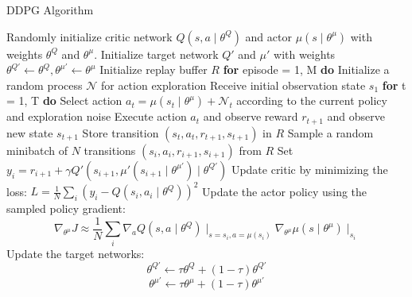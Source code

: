 \begin{algorithm}[H]
    \caption{DDPG Algorithm}
    \begin{algorithmic}[1]
        \State Randomly initialize critic network $Q(s,a \mid \theta^Q)$ and actor $\mu(s \mid \theta^\mu)$ with weights $\theta^Q$ and $\theta^\mu$.
        \State Initialize target network $Q'$ and $\mu'$ with weights $\theta^{Q'} \leftarrow \theta^Q , \theta^{\mu'} \leftarrow \theta^\mu$ 
        \State Initialize replay buffer $R$
        \State \textbf{for} episode = 1, M \textbf{do}
        \Indent
            \State Initialize a random process $\mathcal{N}$ for action exploration
            \State Receive initial observation state $s_1$
            \State \textbf{for} t = 1, T \textbf{do}
            \Indent
                \State Select action $a_t = \mu(s_t \mid \theta^\mu) + \mathcal{N}_t$ according to the current policy and exploration noise
                \State Execute action $a_t$ and observe reward $r_{t+1}$ and observe new state $s_{t+1}$
                \State Store transition $(s_t, a_t, r_{t+1}, s_{t+1})$ in $R$
                \State Sample a random minibatch of $N$ transitions $(s_i,a_i, r_{i+1}, s_{i+1})$ from $R$
                \State Set $y_i = r_{i+1} + \gamma Q' (s_{i+1}, \mu'(s_{i+1} \mid \theta^{\mu'})  \mid \theta^{Q'})$
                \State Update critic by minimizing the loss: 
                $L = \frac{1}{N} \sum_i{(y_i - Q(s_i, a_i \mid \theta^Q))^2}$
                \State Update the actor policy using the sampled policy gradient:
                \State \begin{equation*}
                    \nabla_{\theta^\mu} J \approx \frac{1}{N}
                    \sum_i{\nabla_a Q(s, a \mid \theta^Q) 
                    \mid_{s = s_i, a=\mu(s_i)} \nabla_{\theta^\mu} \mu(s \mid \theta^\mu) \mid_{s_i}}
                \end{equation*}
                \State Update the target networks:
                \State \begin{equation*}
                    \theta^{Q'} \leftarrow \tau \theta^Q
 + (1- \tau) \theta^{Q'}                \end{equation*}
 \begin{equation*}
                    \theta^{\mu'} \leftarrow \tau \theta^\mu
 + (1- \tau) \theta^{\mu'}                \end{equation*}
 
            \EndIndent
        \EndIndent
    \end{algorithmic}
\end{algorithm}